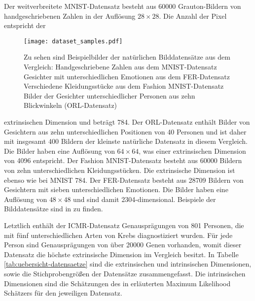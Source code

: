 Der weitverbreitete MNIST-Datensatz besteht aus \num{60000} Grauton-Bildern von handgeschriebenen
Zahlen in der Auflösung $28 \times 28$. Die Anzahl der Pixel entspricht der
\begin{figure}[h]
	\begin{center}
		\texttt{[image: dataset\_samples.pdf]}
	\end{center}
	\caption[Beispielbilder der natürlichen Datensätze]{Zu sehen sind Beispielbilder der natürlichen Bilddatensätze aus dem Vergleich: \captiona Handgeschriebene Zahlen aus dem MNIST-Datensatz \captionb Gesichter mit unterschiedlichen Emotionen aus dem FER-Datensatz \captionc Verschiedene Kleidungsstücke aus dem Fashion MNIST-Datensatz \captiond Bilder der Gesichter unterschiedlicher Personen aus zehn Blickwinkeln (ORL-Datensatz)}
	\label{fig:Dataset_samples}
\end{figure}
extrinsischen Dimension und beträgt 784. Der ORL-Datensatz enthält Bilder von Gesichtern aus
zehn unterschiedlichen Positionen von 40 Personen und ist daher mit insgesamt 400 Bildern der kleinste natürliche Datensatz
in diesem Vergleich. Die Bilder haben eine Auflösung von $64 \times 64$, was einer
extrinsischen Dimension von \num{4096} entspricht. Der Fashion MNIST-Datensatz besteht aus \num{60000} Bildern
von zehn unterschiedlichen Kleidungsstücken. Die extrinsische Dimension ist ebenso wie bei MNIST
784. Der FER-Datensatz besteht aus \num{28 709} Bildern von Gesichtern mit sieben unterschiedlichen
Emotionen. Die Bilder haben eine Auflösung von $48 \times 48$ und sind damit \num{2304}-dimensional.
Beispiele der Bilddatensätze sind in  zu finden.


Letztlich enthält der ICMR-Datensatz Genausprägungen von 801 Personen, die mit fünf
unterschiedlichen Arten von Krebs diagnostiziert wurden. Für jede Person sind Genausprägungen von
über \num{20000} Genen vorhanden, womit dieser Datensatz die höchste extrinsische Dimension im
Vergleich besitzt. In Tabelle \ref{tab:uebersicht-datensaetze} sind die extrinsischen und
intrinsischen Dimensionen, sowie die Stichprobengrößen der Datensätze zusammengefasst. Die
intrinsischen Dimensionen sind die Schätzungen des in
 erläuterten Maximum
Likelihood Schätzers für den jeweiligen Datensatz.

